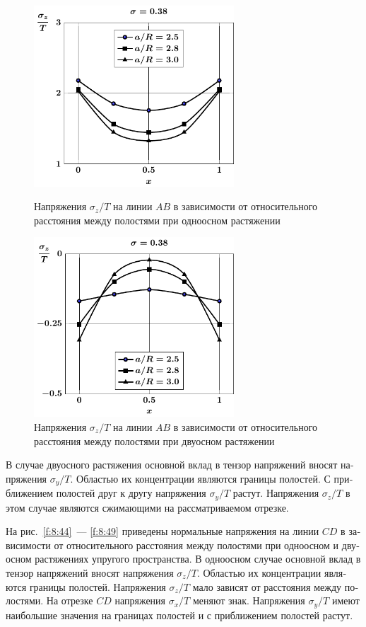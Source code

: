 \begin{russian}
\begin{figure}[h!]
\centering\footnotesize
\parbox[b]{7.5cm}{\centering\includegraphics[width=7.5cm]{spheres-cav13-a-t1-sig_z.pdf}
\caption{Напряжения $\sigma_z/T$ на линии $AB$ в зависимости от относительного расстояния между полостями при одноосном растяжении
\label{f:8:42}}}\hfil\hfil
\parbox[b]{7.5cm}{\centering\includegraphics[width=7.5cm]{spheres-cav13-a-t2-sig_z.pdf}
\caption{Напряжения $\sigma_z/T$ на линии $AB$ в зависимости от относительного расстояния между полостями при двуосном растяжении
\label{f:8:43}}}
\end{figure}

В случае двуосного растяжения основной вклад в тензор напряжений вносят напряжения $\sigma_y/T$. Областью их концентрации являются границы полостей. С приближением полостей друг к другу напряжения $\sigma_y/T$ растут. Напряжения $\sigma_z/T$ в этом случае являются сжимающими на рассматриваемом отрезке.

На рис.~\ref{f:8:44}~--- \ref{f:8:49} приведены нормальные напряжения на линии $CD$ в зависимости от относительного расстояния между полостями при одноосном и двуосном растяжениях упругого пространства. В одноосном случае основной вклад в тензор напряжений вносят напряжения $\sigma_z/T$. Областью их концентрации являются границы полостей. Напряжения $\sigma_z/T$ мало зависят от расстояния между полостями. На отрезке $CD$ напряжения $\sigma_x/T$ меняют знак. Напряжения $\sigma_y/T$ имеют наибольшие значения на границах полостей и с приближением полостей растут.


\end{russian}
